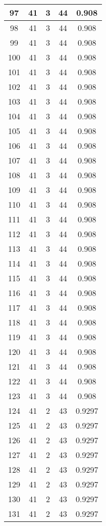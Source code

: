 \documentclass[letterpaper, 12pt]{article}
\begin{document}
\begin{longtable}{|c|c|c|c|c|}
\hline
97 & 41 & 3 & 44 & 0.908 \\
\hline
98 & 41 & 3 & 44 & 0.908 \\
\hline
99 & 41 & 3 & 44 & 0.908 \\
\hline
100 & 41 & 3 & 44 & 0.908 \\
\hline
101 & 41 & 3 & 44 & 0.908 \\
\hline
102 & 41 & 3 & 44 & 0.908 \\
\hline
103 & 41 & 3 & 44 & 0.908 \\
\hline
104 & 41 & 3 & 44 & 0.908 \\
\hline
105 & 41 & 3 & 44 & 0.908 \\
\hline
106 & 41 & 3 & 44 & 0.908 \\
\hline
107 & 41 & 3 & 44 & 0.908 \\
\hline
108 & 41 & 3 & 44 & 0.908 \\
\hline
109 & 41 & 3 & 44 & 0.908 \\
\hline
110 & 41 & 3 & 44 & 0.908 \\
\hline
111 & 41 & 3 & 44 & 0.908 \\
\hline
112 & 41 & 3 & 44 & 0.908 \\
\hline
113 & 41 & 3 & 44 & 0.908 \\
\hline
114 & 41 & 3 & 44 & 0.908 \\
\hline
115 & 41 & 3 & 44 & 0.908 \\
\hline
116 & 41 & 3 & 44 & 0.908 \\
\hline
117 & 41 & 3 & 44 & 0.908 \\
\hline
118 & 41 & 3 & 44 & 0.908 \\
\hline
119 & 41 & 3 & 44 & 0.908 \\
\hline
120 & 41 & 3 & 44 & 0.908 \\
\hline
121 & 41 & 3 & 44 & 0.908 \\
\hline
122 & 41 & 3 & 44 & 0.908 \\
\hline
123 & 41 & 3 & 44 & 0.908 \\
\hline
124 & 41 & 2 & 43 & 0.9297 \\
\hline
125 & 41 & 2 & 43 & 0.9297 \\
\hline
126 & 41 & 2 & 43 & 0.9297 \\
\hline
127 & 41 & 2 & 43 & 0.9297 \\
\hline
128 & 41 & 2 & 43 & 0.9297 \\
\hline
129 & 41 & 2 & 43 & 0.9297 \\
\hline
130 & 41 & 2 & 43 & 0.9297 \\
\hline
131 & 41 & 2 & 43 & 0.9297 \\

\end{longtable}
\end{document}

